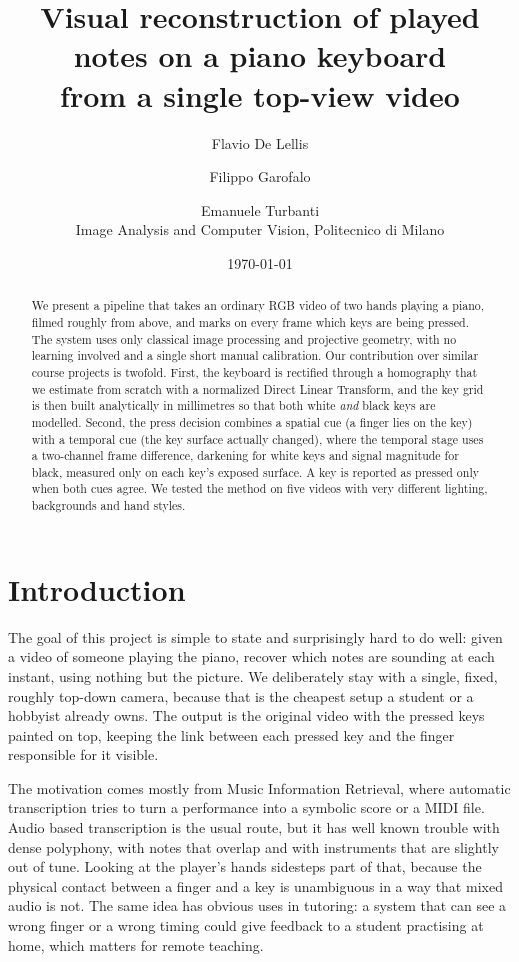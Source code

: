 \documentclass[11pt]{article}
\title{\textbf{Visual reconstruction of played notes on a piano keyboard\\
from a single top-view video}}
\author{
  Flavio De Lellis \and
  Filippo Garofalo \and
  Emanuele Turbanti \\[4pt]
  \small Image Analysis and Computer Vision, Politecnico di Milano
}
\date{\today} %
\begin{document}
\maketitle

\begin{abstract}
\noindent
We present a pipeline that takes an ordinary RGB video of two hands playing a
piano, filmed roughly from above, and marks on every frame which keys are being
pressed. The system uses only classical image processing and projective
geometry, with no learning involved and a single short manual calibration. Our
contribution over similar course projects is twofold. First, the keyboard is
rectified through a homography that we estimate from scratch with a normalized
Direct Linear Transform, and the key grid is then built analytically in
millimetres so that both white \emph{and} black keys are modelled. Second, the
press decision combines a spatial cue (a finger lies on the key) with a temporal
cue (the key surface actually changed), where the temporal stage uses a
two-channel frame difference, darkening for white keys and signal magnitude for
black, measured only on each key's exposed surface. A key
is reported as pressed only when both cues agree. We tested the method on five
videos with very different lighting, backgrounds and hand styles.
\end{abstract}

\section{Introduction}
The goal of this project is simple to state and surprisingly hard to do well:
given a video of someone playing the piano, recover which notes are sounding at
each instant, using nothing but the picture. We deliberately stay with a
single, fixed, roughly top-down camera, because that is the cheapest setup a
student or a hobbyist already owns. The output is the original video with the
pressed keys painted on top, keeping the link between each pressed key and the
finger responsible for it visible.

The motivation comes mostly from Music Information Retrieval, where automatic
transcription tries to turn a performance into a symbolic score or a MIDI
file. Audio based transcription is the usual
route, but it has well known trouble with dense polyphony, with notes that
overlap and with instruments that are slightly out of tune. Looking at the
player's hands sidesteps part of that, because the physical contact between a
finger and a key is unambiguous in a way that mixed audio is not. The same idea
has obvious uses in tutoring: a system that can see a wrong finger or a wrong
timing could give feedback to a student practising at home, which matters for
remote teaching.
\end{document}
